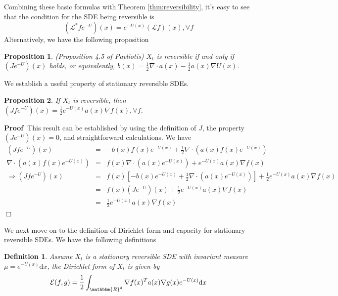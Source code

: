 \documentclass[english, aip, jcp, priprint, graphicx]{revtex4-1}
\newtheorem{definition}{Definition}
\newtheorem{proposition}{Proposition}
\theoremstyle{plain}
\theoremstyle{definition}
\theoremstyle{plain}
\begin{document}
Combining these basic formulas with Theorem \ref{thm:reversibility}, it's easy
to see that the condition for the SDE being reversible is
\[ (\mathcal{L}^{\ast} f e^{-U}) (x) = e^{- U (x)} (\mathcal{L} f) (x),
\forall f \]
Alternatively, we have the following proposition

\begin{proposition}
(Proposition 4.5 of Pavliotis\cite{Pavliotis2016-xn}) $X_t$ is reversible if
and only if $(J e^{- U })(x)$ holds, or equivalently, $b (x) = \frac{1}{2}
\nabla \cdot a (x) - \frac{1}{2} a (x) \nabla U (x)$.
\end{proposition}

We establish a useful property of stationary reversible SDEs.

\begin{proposition}\label{prop:property_reversible_sde}
If $X_t$ is reversible, then $(J f e^{- U })(x) = \frac{1}{2} e^{- U
(x)} a (x) \nabla f (x) , \forall f$.
\end{proposition}

\noindent\textbf{Proof\ }This result can be established by using the
definition of $J$, the property $(J e^{- U })(x) = 0$, and straightforward
calculations. We have
\begin{eqnarray*}
(J f e^{- U })(x) & = & - b (x) f (x) e^{- U (x)} + \frac{1}{2} \nabla
\cdot (a (x) f (x) e^{- U (x)})\\
\nabla \cdot (a (x) f (x) e^{- U (x)}) & = & f (x) \nabla \cdot (a (x) e^{-
U (x)}) + e^{- U (x)} a (x) \nabla f (x)\\
\Longrightarrow (J f e^{- U })(x) & = & f (x) \left[ - b (x) e^{- U (x)}
+ \frac{1}{2} \nabla \cdot (a (x) e^{- U (x)}) \right] + \frac{1}{2} e^{- U
(x)} a (x) \nabla f (x)\\
& = & f (x) (J e^{- U })(x) + \frac{1}{2} e^{- U (x)} a (x) \nabla f (x)\\
& = & \frac{1}{2} e^{- U (x)} a (x) \nabla f (x)
\end{eqnarray*}\hspace*{\fill}$\Box$\medskip

We next move on to the definition of Dirichlet form and capacity for
stationary reversible SDEs. We have the following definitions

\begin{definition}
Assume $X_t$ is a stationary reversible SDE with invariant measure
${\mu}= e^{- U (x)} \mathrm{d} x$, the Dirichlet form of $X_t$ is given
by
\[ \mathcal{E} (f, g) = \frac{1}{2} \int_{\mathbbm{R}^d} \nabla f (x)^T a
(x) \nabla g (x) e^{- U (x)} \mathrm{d} x \]
\end{definition}
\end{document}
